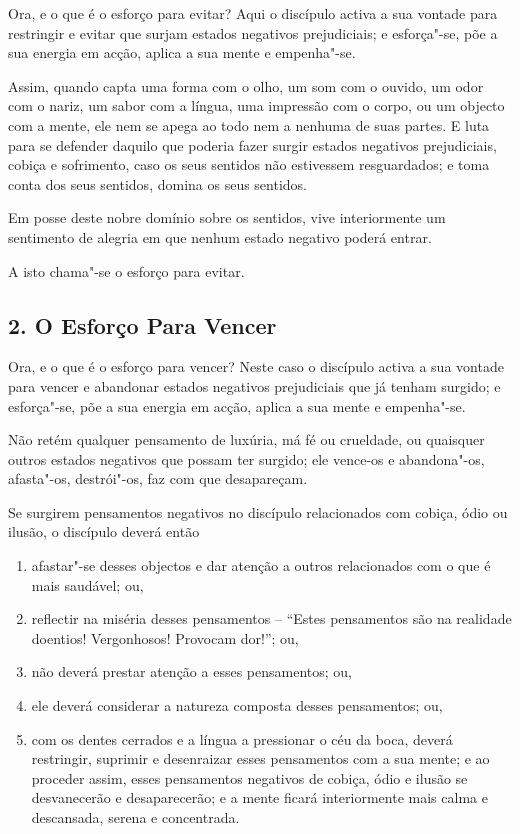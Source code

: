 
Ora, e o que é o esforço para evitar? Aqui o discípulo activa a sua
vontade para restringir e evitar que surjam estados negativos prejudiciais; e esforça"-se, põe
a sua energia em acção, aplica a sua mente e empenha"-se.

Assim, quando capta uma forma com o olho, um som com o ouvido, um odor com o
nariz, um sabor com a língua, uma impressão com o corpo, ou um objecto com a
mente, ele nem se apega ao todo nem a nenhuma de suas partes. E luta para se
defender daquilo que poderia fazer surgir estados negativos prejudiciais, cobiça
e sofrimento, caso os seus sentidos não estivessem resguardados; e toma conta
dos seus sentidos, domina os seus sentidos.

Em posse deste nobre domínio sobre os sentidos, vive interiormente um sentimento
de alegria em que nenhum estado negativo poderá entrar.

A isto chama"-se o esforço para evitar.

\subsection{2. O Esforço Para Vencer}


Ora, e o que é o esforço para vencer? Neste caso o discípulo activa a
sua vontade para vencer e abandonar estados negativos prejudiciais que já tenham surgido;
e esforça"-se, põe a sua energia em acção, aplica a sua mente e empenha"-se.

Não retém qualquer pensamento de luxúria, má fé ou crueldade, ou quaisquer
outros estados negativos que possam ter surgido; ele vence-os e abandona"-os, afasta"-os,
destrói"-os, faz com que desapareçam.


Se surgirem pensamentos negativos no discípulo relacionados com cobiça, ódio ou
ilusão, o discípulo deverá então

\begin{enumerate}
  \item afastar"-se desses objectos e dar atenção a outros relacionados com o que
        é mais saudável; ou,

  \item reflectir na miséria desses pensamentos -- “Estes pensamentos são na
  realidade doentios! Vergonhosos! Provocam dor!”; ou,

  \item não deverá prestar atenção a esses pensamentos; ou,

  \item ele deverá considerar a natureza composta desses pensamentos; ou,

  \item com os dentes cerrados e a língua a pressionar o céu da boca, deverá
        restringir, suprimir e desenraizar esses pensamentos com a sua mente; e
        ao proceder assim, esses pensamentos negativos de cobiça, ódio e ilusão
        se desvanecerão e desaparecerão; e a mente ficará interiormente mais
        calma e descansada, serena e concentrada.
\end{enumerate}

